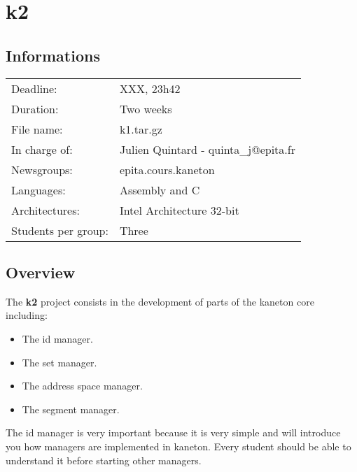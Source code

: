
%
%

\section{k2}

%
%

\subsection{Informations}

\begin{tabular}{p{7cm}l}
Deadline: & XXX, 23h42 \\
Duration: & Two weeks \\
File name: & k1.tar.gz \\
In charge of: & Julien Quintard - \small{quinta\_j@epita.fr} \\
Newsgroups: & epita.cours.kaneton \\
Languages: & Assembly and C \\
Architectures: & Intel Architecture 32-bit \\
Students per group: & Three \\
\end{tabular}

%
%

\subsection{Overview}

The \textbf{k2} project consists in the development of parts of
the kaneton core including:

\begin{itemize}
  \item
    The id manager.
  \item
    The set manager.
  \item
    The address space manager.
  \item
    The segment manager.
\end{itemize}

The id manager is very important because it is very simple and will
introduce you how managers are implemented in kaneton. Every student
should be able to understand it before starting other managers.


